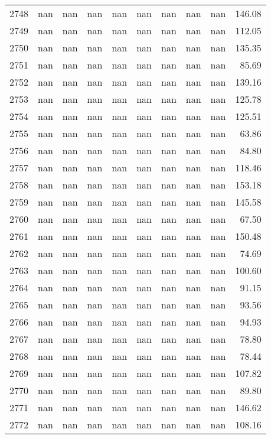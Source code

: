 \begin{tabular}{lrrrrrrrrr}
2748 & nan & nan & nan & nan & nan & nan & nan & nan & 146.08 \\
2749 & nan & nan & nan & nan & nan & nan & nan & nan & 112.05 \\
2750 & nan & nan & nan & nan & nan & nan & nan & nan & 135.35 \\
2751 & nan & nan & nan & nan & nan & nan & nan & nan & 85.69 \\
2752 & nan & nan & nan & nan & nan & nan & nan & nan & 139.16 \\
2753 & nan & nan & nan & nan & nan & nan & nan & nan & 125.78 \\
2754 & nan & nan & nan & nan & nan & nan & nan & nan & 125.51 \\
2755 & nan & nan & nan & nan & nan & nan & nan & nan & 63.86 \\
2756 & nan & nan & nan & nan & nan & nan & nan & nan & 84.80 \\
2757 & nan & nan & nan & nan & nan & nan & nan & nan & 118.46 \\
2758 & nan & nan & nan & nan & nan & nan & nan & nan & 153.18 \\
2759 & nan & nan & nan & nan & nan & nan & nan & nan & 145.58 \\
2760 & nan & nan & nan & nan & nan & nan & nan & nan & 67.50 \\
2761 & nan & nan & nan & nan & nan & nan & nan & nan & 150.48 \\
2762 & nan & nan & nan & nan & nan & nan & nan & nan & 74.69 \\
2763 & nan & nan & nan & nan & nan & nan & nan & nan & 100.60 \\
2764 & nan & nan & nan & nan & nan & nan & nan & nan & 91.15 \\
2765 & nan & nan & nan & nan & nan & nan & nan & nan & 93.56 \\
2766 & nan & nan & nan & nan & nan & nan & nan & nan & 94.93 \\
2767 & nan & nan & nan & nan & nan & nan & nan & nan & 78.80 \\
2768 & nan & nan & nan & nan & nan & nan & nan & nan & 78.44 \\
2769 & nan & nan & nan & nan & nan & nan & nan & nan & 107.82 \\
2770 & nan & nan & nan & nan & nan & nan & nan & nan & 89.80 \\
2771 & nan & nan & nan & nan & nan & nan & nan & nan & 146.62 \\
2772 & nan & nan & nan & nan & nan & nan & nan & nan & 108.16 \\

\end{tabular}
